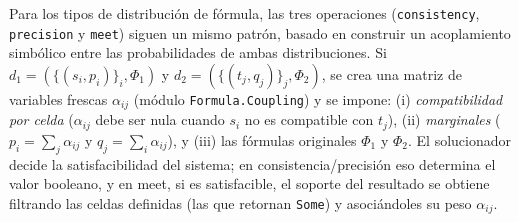 Para los tipos de distribución de fórmula, las tres operaciones (\verb|consistency|, \verb|precision| y \verb|meet|) siguen un mismo patrón, basado en construir un acoplamiento simbólico entre las probabilidades de ambas distribuciones. Si $d_1=(\{(s_i,p_i)\}_i,\Phi_1)$ y $d_2=(\{(t_j,q_j)\}_j,\Phi_2)$, se crea una matriz de variables frescas $\alpha_{ij}$ (módulo \verb|Formula.Coupling|) y se impone: (i) \emph{compatibilidad por celda} ($\alpha_{ij}$ debe ser nula cuando $s_i$ no es compatible con $t_j$), (ii) \emph{marginales} ($p_i=\sum_j \alpha_{ij}$ y $q_j=\sum_i \alpha_{ij}$), y (iii) las fórmulas originales $\Phi_1$ y $\Phi_2$. El solucionador decide la satisfacibilidad del sistema; en consistencia/precisión eso determina el valor booleano, y en meet, si es satisfacible, el soporte del resultado se obtiene filtrando las celdas definidas (las que retornan \verb|Some|) y asociándoles su peso $\alpha_{ij}$.

